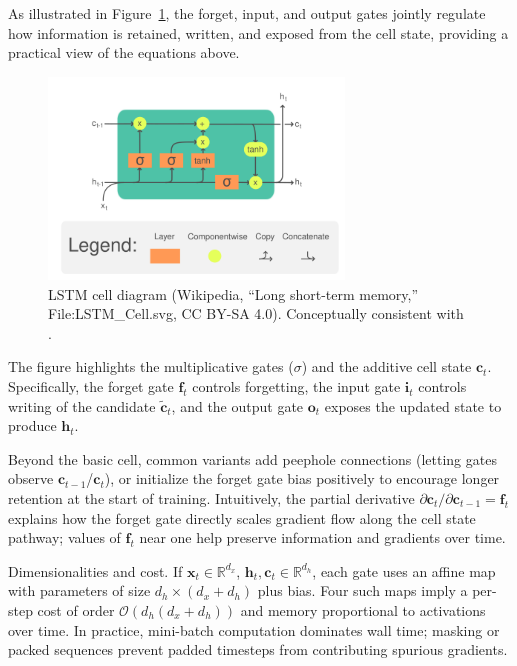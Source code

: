 As illustrated in Figure~\ref{fig:lstm_cell_wiki}, the forget, input, and output gates jointly regulate how information is retained, written, and exposed from the cell state, providing a practical view of the equations above.

\begin{figure}[tbp]
\centering
\includegraphics[width=0.7\textwidth]{logos/LSTM_Cell.png}
\caption[LSTM cell diagram]{LSTM cell diagram (Wikipedia, “Long short-term memory,” File:LSTM\_Cell.svg, CC BY-SA 4.0). Conceptually consistent with \cite{hochreiter1997long}.}
\label{fig:lstm_cell_wiki}
\end{figure}

The figure highlights the multiplicative gates (\(\sigma\)) and the additive cell state \(\mathbf{c}_t\). Specifically, the forget gate \(\mathbf{f}_t\) controls forgetting, the input gate \(\mathbf{i}_t\) controls writing of the candidate \(\tilde{\mathbf{c}}_t\), and the output gate \(\mathbf{o}_t\) exposes the updated state to produce \(\mathbf{h}_t\).

Beyond the basic cell, common variants add peephole connections (letting gates observe \(\mathbf{c}_{t-1}\)/\(\mathbf{c}_t\)), or initialize the forget gate bias positively to encourage longer retention at the start of training. Intuitively, the partial derivative \(\partial \mathbf{c}_t/\partial \mathbf{c}_{t-1} = \mathbf{f}_t\) explains how the forget gate directly scales gradient flow along the cell state pathway; values of \(\mathbf{f}_t\) near one help preserve information and gradients over time.

Dimensionalities and cost. If \(\mathbf{x}_t \in \mathbb{R}^{d_x}\), \(\mathbf{h}_t, \mathbf{c}_t \in \mathbb{R}^{d_h}\), each gate uses an affine map with parameters of size \(d_h\times(d_x+d_h)\) plus bias. Four such maps imply a per-step cost of order \(\mathcal{O}(d_h(d_x+d_h))\) and memory proportional to activations over time. In practice, mini-batch computation dominates wall time; masking or packed sequences prevent padded timesteps from contributing spurious gradients.

